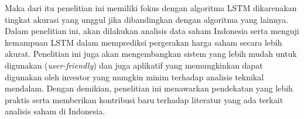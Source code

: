 Maka dari itu penelitian ini memiliki fokus dengan algoritma LSTM dikarenakan tingkat akurasi yang unggul jika dibandingkan dengan algoritma yang lainnya. Dalam penelitian ini, akan dilakukan analisis data saham Indonesia serta menguji kemampuan LSTM dalam memprediksi pergerakan harga saham secara lebih akurat. Penelitian ini juga akan mengembangkan sistem yang lebih mudah untuk digunakan (\textit{user-friendly}) dan juga aplikatif yang memungkinkan dapat digunakan oleh investor yang mungkin minim terhadap analisis teknikal mendalam. Dengan demikian, penelitian ini menawarkan pendekatan yang lebih praktis serta memberikan kontribusi baru terhadap literatur yang ada terkait analisis saham di Indonesia.

\pagebreak
